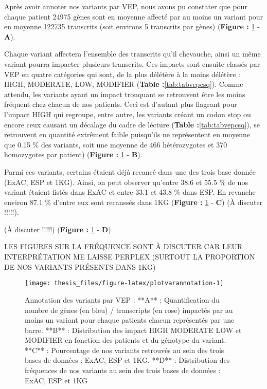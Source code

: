 \documentclass[12pt,twoside]{reedthesis}
\theoremstyle{definition}
\theoremstyle{definition}
\theoremstyle{remark}
\begin{document}
  Après avoir annoter nos variants par VEP, nous avons pu constater que
  pour chaque patient 24975 gènes sont en moyenne affecté par au moins un
  variant pour en moyenne 122735 transcrits (soit environs 5 transcrits
  par gènes) (\textbf{Figure : }\ref{fig:plotvarannotation} - \textbf{A}).
  
  Chaque variant affectera l'ensemble des transcrits qu'il chevauche,
  ainsi un même variant pourra impacter plusieurs transcrits. Ces impacts
  sont ensuite classés par VEP en quatre catégories qui sont, de la plus
  délétère à la moins délétère : HIGH, MODERATE, LOW, MODIFIER
  (\textbf{Table :}\ref{tab:tabvepcsq}). Comme attendu, les variants ayant
  un impact tronquant se retrouvent être les moins fréquent chez chacun de
  nos patients. Ceci est d'autant plus flagrant pour l'impact HIGH qui
  regroupe, entre autre, les variants créant un codon stop ou encore ceux
  causant un décalage du cadre de lécture (\textbf{Table
  :}\ref{tab:tabvepcsq}), se retrouvent en quantité extrêment faible
  puisqu'ils ne représentent en moyenne que 0.15 \% des variants, soit une
  moyenne de 466 hétérozygotes et 370 homozygotes par patient)
  (\textbf{Figure : }\ref{fig:plotvarannotation} - \textbf{B}).
  
  Parmi ces variants, certains étaient déjà recancé dans une des trois
  base donnée (ExAC, ESP et 1KG). Ainsi, on peut observer qu'entre 38.6 et
  55.5 \% de nos variant étaient listés dans ExAC et entre 33.1 et 43.8 \%
  dans ESP. En revanche environ 87.1 \% d'entre eux sont recanssés dans
  1KG (\textbf{Figure : }\ref{fig:plotvarannotation} - \textbf{C}) (À
  discuter !!!!!).
  
  (À discuter !!!!!) (\textbf{Figure : }\ref{fig:plotvarannotation} -
  \textbf{D})
  
  LES FIGURES SUR LA FRÉQUENCE SONT À DISCUTER CAR LEUR INTERPRÉTATION ME
  LAISSE PERPLEX (SURTOUT LA PROPORTION DE NOS VARIANTS PRÉSENTS DANS 1KG)
  
  \newpage
  
  \begin{figure}
  
  {\centering \texttt{[image: thesis\_files/figure-latex/plotvarannotation-1]} 
  
  }
  
  \caption[Annotation des variants par VEP]{Annotation des variants par VEP : **A** : Quantification du nombre de gènes (en bleu) / transcripts (en rose) impactés par au moins un variant pour chaque patients chacun représentés par une barre. **B** : Distribution des impact HIGH MODERATE LOW et MODIFIER en fonction des patients et du génotype du variant. **C** : Pourcentage de nos variants retrouvés au sein des trois bases de données : ExAC, ESP et 1KG. **D** : Distribution des fréquences de nos variants au sein des trois bases de données : ExAC, ESP et 1KG}\label{fig:plotvarannotation}
  \end{figure}
  
\end{document}
